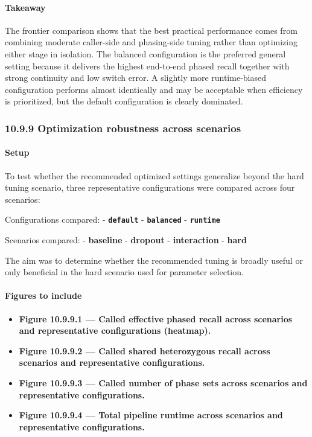 \documentclass[
]{article}
\providecommand{\tightlist}{%
  \setlength{\itemsep}{0pt}\setlength{\parskip}{0pt}}
\begin{document}
\paragraph{Takeaway}\label{takeaway-14}

The frontier comparison shows that the best practical performance comes
from combining moderate caller-side and phasing-side tuning rather than
optimizing either stage in isolation. The balanced configuration is the
preferred general setting because it delivers the highest end-to-end
phased recall together with strong continuity and low switch error. A
slightly more runtime-biased configuration performs almost identically
and may be acceptable when efficiency is prioritized, but the default
configuration is clearly dominated.

\subsubsection{10.9.9 Optimization robustness across
scenarios}\label{optimization-robustness-across-scenarios}

\paragraph{Setup}\label{setup-15}

To test whether the recommended optimized settings generalize beyond the
hard tuning scenario, three representative configurations were compared
across four scenarios:

Configurations compared: - \textbf{\texttt{default}} -
\textbf{\texttt{balanced}} - \textbf{\texttt{runtime}}

Scenarios compared: - \textbf{baseline} - \textbf{dropout} -
\textbf{interaction} - \textbf{hard}

The aim was to determine whether the recommended tuning is broadly
useful or only beneficial in the hard scenario used for parameter
selection.

\paragraph{Figures to include}\label{figures-to-include-15}

\begin{itemize}
\tightlist
\item
  \textbf{Figure 10.9.9.1 --- Called effective phased recall across
  scenarios and representative configurations (heatmap).}
\item
  \textbf{Figure 10.9.9.2 --- Called shared heterozygous recall across
  scenarios and representative configurations.}
\item
  \textbf{Figure 10.9.9.3 --- Called number of phase sets across
  scenarios and representative configurations.}
\item
  \textbf{Figure 10.9.9.4 --- Total pipeline runtime across scenarios
  and representative configurations.}
\end{itemize}
\end{document}

